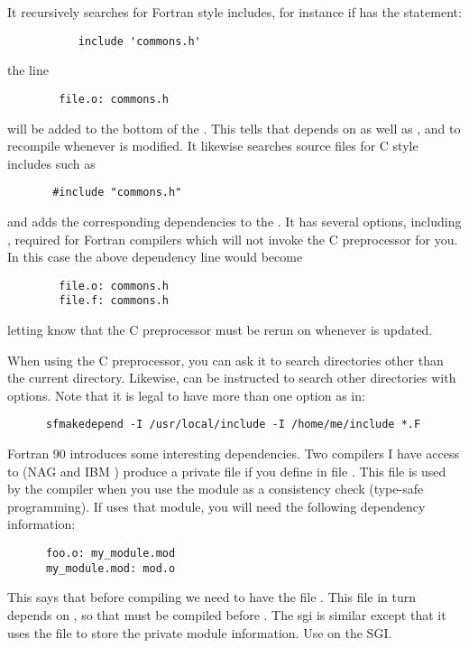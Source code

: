 It recursively searches for Fortran
style includes, for instance if  has the statement:
\begin{verbatim}
           include 'commons.h'
\end{verbatim}
the line
\begin{verbatim}
        file.o: commons.h
\end{verbatim}
will be added to the bottom of the .  This tells
 that  depends on  as well
as , and to recompile  whenever
 is modified.
It likewise searches source files for C style includes such as
\begin{verbatim}
       #include "commons.h"
\end{verbatim}
and adds the corresponding dependencies to the .
It has several options, including , required for Fortran
compilers which will not invoke the C preprocessor for you.  In this
case the above dependency line would become
\begin{verbatim}
        file.o: commons.h
        file.f: commons.h
\end{verbatim}
letting  know that the C preprocessor must be rerun on
 whenever  is updated.

When using the C preprocessor, you can ask it to search directories
other than the current directory.  Likewise,  can be
instructed to search other directories with  options.
Note that it is legal to have more than one  option as in:
\begin{verbatim}
      sfmakedepend -I /usr/local/include -I /home/me/include *.F
\end{verbatim}

Fortran 90 introduces some interesting dependencies.  Two compilers I
have access to (NAG  and IBM ) produce a private
 file if you define 
 in file .  This file is used by the
compiler when you use the module as a consistency check (type-safe
programming).  If  uses that module, you will need the
following dependency information:
\begin{verbatim}
      foo.o: my_module.mod
      my_module.mod: mod.o
\end{verbatim}
This says that before compiling  we need to have the file
.  This file in turn depends on , so
that  must be compiled before .
The sgi is similar except that it uses the file 
to store the private module information.  Use 
on the SGI.

